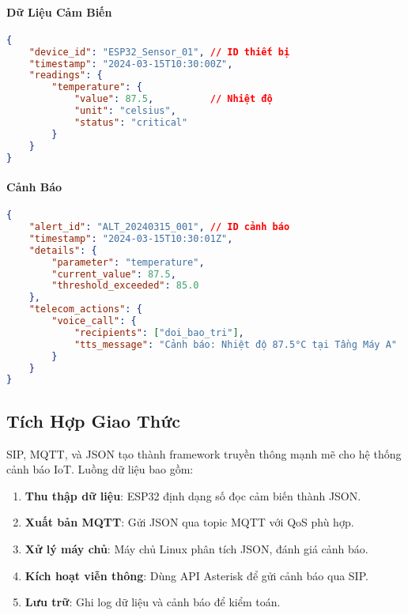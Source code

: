\paragraph{Dữ Liệu Cảm Biến}
\begin{lstlisting}[language=json, caption=Payload cảm biến MQTT, label=lst:sensor_payload]
{
    "device_id": "ESP32_Sensor_01", // ID thiết bị
    "timestamp": "2024-03-15T10:30:00Z",
    "readings": {
        "temperature": {
            "value": 87.5,          // Nhiệt độ
            "unit": "celsius",
            "status": "critical"
        }
    }
}
\end{lstlisting}

\paragraph{Cảnh Báo}
\begin{lstlisting}[language=json, caption=Payload cảnh báo, label=lst:alert_payload]
{
    "alert_id": "ALT_20240315_001", // ID cảnh báo
    "timestamp": "2024-03-15T10:30:01Z",
    "details": {
        "parameter": "temperature",
        "current_value": 87.5,
        "threshold_exceeded": 85.0
    },
    "telecom_actions": {
        "voice_call": {
            "recipients": ["doi_bao_tri"],
            "tts_message": "Cảnh báo: Nhiệt độ 87.5°C tại Tầng Máy A"
        }
    }
}
\end{lstlisting}

\subsection{Tích Hợp Giao Thức}
\label{subsec:protocol_integration}

SIP, MQTT, và JSON tạo thành framework truyền thông mạnh mẽ cho hệ thống cảnh báo IoT. Luồng dữ liệu bao gồm:

\begin{enumerate}
    \item \textbf{Thu thập dữ liệu}: ESP32 định dạng số đọc cảm biến thành JSON.
    \item \textbf{Xuất bản MQTT}: Gửi JSON qua topic MQTT với QoS phù hợp.
    \item \textbf{Xử lý máy chủ}: Máy chủ Linux phân tích JSON, đánh giá cảnh báo.
    \item \textbf{Kích hoạt viễn thông}: Dùng API Asterisk để gửi cảnh báo qua SIP.
    \item \textbf{Lưu trữ}: Ghi log dữ liệu và cảnh báo để kiểm toán.
\end{enumerate}


